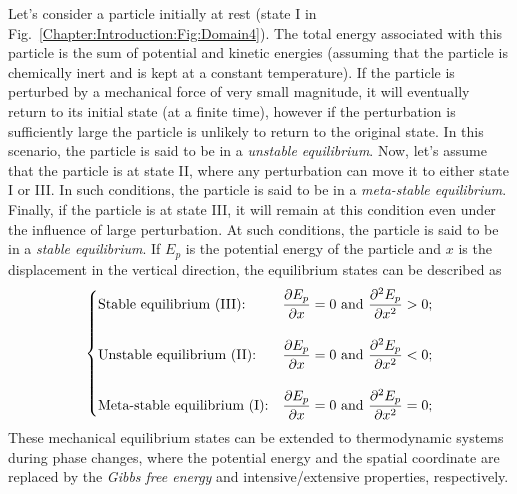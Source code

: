    Let's consider a particle initially at rest (state I in Fig.~\ref{Chapter:Introduction:Fig:Domain4}). The total energy associated with this particle is the sum of potential and kinetic energies (assuming that the particle is chemically inert and is kept at a constant temperature). If the particle is perturbed by a mechanical force of very small magnitude, it will eventually return to its initial state (\ie at a finite time), however if the perturbation is sufficiently large the particle is unlikely to return to the original state. In this scenario, the particle is said to be in a {\it unstable equilibrium}. Now, let's assume that the particle is at state II, where any perturbation can move it to either state I or III. In such conditions, the particle is said to be in a {\it meta-stable equilibrium}. Finally, if the particle is at state III, it will remain at this condition even under the influence of large perturbation. At such conditions, the particle is said to be in a {\it stable equilibrium}. If $E_{p}$ is the potential energy of the particle and $x$ is the displacement in the vertical direction, the equilibrium states can be described as
   \begin{equation}
      \begin{cases}
         \text{Stable equilibrium (III):}  & \displaystyle\frac{\partial E_{p}}{\partial x} = 0 \text{ and } \displaystyle\frac{\partial^{2} E_{p}}{\partial x^{2}} > 0; \\
          \\
         \text{Unstable equilibrium (II):}  & \displaystyle\frac{\partial E_{p}}{\partial x} = 0 \text{ and } \displaystyle\frac{\partial^{2} E_{p}}{\partial x^{2}} < 0; \\
          \\
         \text{Meta-stable equilibrium (I):}  & \displaystyle\frac{\partial E_{p}}{\partial x} = 0 \text{ and } \displaystyle\frac{\partial^{2} E_{p}}{\partial x^{2}} = 0; \\
      \end{cases}
   \end{equation}
   These mechanical equilibrium states can be extended to thermodynamic systems during phase changes, where the potential energy and the spatial coordinate are replaced by the {\it Gibbs free energy} and intensive/extensive properties, respectively.

   \bigskip

